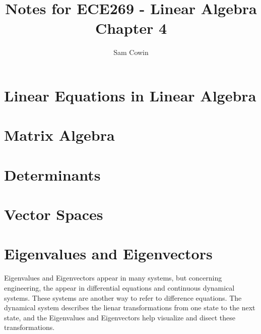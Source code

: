 \documentclass[12pt]{article}
\begin{document}
\setlength{\abovedisplayskip}{0pt}
\setlength{\belowdisplayskip}{0pt}
\setlength{\abovedisplayshortskip}{0pt}
\setlength{\belowdisplayshortskip}{0pt}

\title{Notes for ECE269 - Linear Algebra \\
\large Chapter 4}
\author{Sam Cowin}
\maketitle

\section{Linear Equations in Linear Algebra}
\section{Matrix Algebra}
\section{Determinants}
\section{Vector Spaces}
\section{Eigenvalues and Eigenvectors}
Eigenvalues and Eigenvectors appear in many systems, but concerning engineering, the appear in differential equations and continuous dynamical systems. These systems are another way to refer
to difference equations. The dynamical system describes the lienar transformations from one state to the next state, and the Eigenvalues and Eigenvectors help visualize and disect these 
transformations. 
\end{document}
